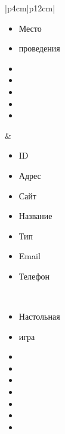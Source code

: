 \begin{table}[h!]
\begin{center}
\begin{threeparttable}
\begin{tabular}{|p{4cm}|p{12cm}|}
\begin{minipage}[t]{\linewidth}
\begin{multicols}{1}
\begin{itemize}[leftmargin=0mm,labelsep=0mm,nosep,after=\strut]
                  \item[] Место 
                  \item[] проведения
                  \item[]
                  \item[]
                  \item[]
                  \item[]
                  \item[]
                \end{itemize}
              \end{multicols}
            \end{minipage}
          & \begin{minipage}[t]{\linewidth}
              \begin{multicols}{2}
                \begin{itemize}[leftmargin=0mm,labelsep=0mm,nosep,after=\strut]
                  \item[] ID
                  \item[] Адрес
                  \item[] Сайт
                  \item[] Название
                  \item[] Тип
                  \item[] Email
                  \item[] Телефон
                \end{itemize}
              \end{multicols}
            \end{minipage}\\
            \hline
            \begin{minipage}[t]{\linewidth}
              \begin{multicols}{1}
                \begin{itemize}[leftmargin=0mm,labelsep=0mm,nosep,after=\strut]
                  \item[] Настольная
                  \item[] игра
                  \item[]
                  \item[]
                  \item[]
                  \item[]
                  \item[]
                  \item[]
                  \item[]

\end{itemize}
\end{multicols}
\end{minipage}
\end{tabular}
\end{threeparttable}
\end{center}
\end{table}

